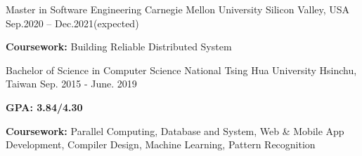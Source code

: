 


\begin{cventries}


\cventry
{Master in Software Engineering} %
{Carnegie Mellon University} %
{Silicon Valley, USA} %
{Sep.2020 -- Dec.2021(expected)} %
{ %
\begin{cvitems}
\item {\textbf{Coursework:} Building Reliable Distributed System}
\end{cvitems}
}




\cventry
{Bachelor of Science in Computer Science} %
{National Tsing Hua University} %
{Hsinchu, Taiwan} %
{Sep. 2015 - June. 2019} %
{ %
\begin{cvitems}
\item \textbf{{GPA: 3.84/4.30}}
\item {\textbf{Coursework:} Parallel Computing, Database and System, Web \& Mobile App Development, Compiler Design, Machine Learning, Pattern Recognition}
\end{cvitems}
}

\end{cventries}